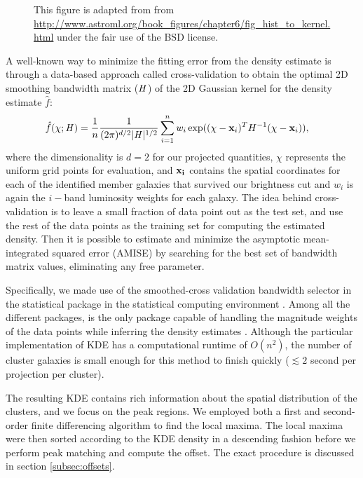 \begin{figure*}
	\caption{This figure is adapted from \citealt{Vanderplas2012} from
\href{http://www.astroml.org/book\_figures/chapter6/fig\_hist\_to\_kernel.html}{http://www.astroml.org/book\_figures/chapter6/fig\_hist\_to\_kernel.html}
under the fair use of the BSD license. \label{fig:bias_variance_tradeoff} }
\end{figure*}
A well-known way to minimize the fitting error from the density estimate is through
a data-based approach called cross-validation to obtain 
the optimal 2D smoothing
bandwidth matrix ($\mathbf{\it H}$) of the 2D Gaussian kernel for the
density estimate $\hat{f}$:
\begin{align}
	\hat{f}(\chi; \mathbf{\it H}) &= \frac{1}{n} \frac{1}{(2\pi)^{d/2}|\mathbf{\it H}|^{1/2}}
	\sum_{i=1}^n w_i \exp((\chi-{\bf x}_i)^T H^{-1} (\chi-{\bf x}_i)),
	\label{eq:cross_validated_bandwidth}
\end{align}
where the dimensionality is $d=2$ for our projected quantities,
$\chi$ represents the uniform grid points for evaluation, and 
$\bf{x}_i$ contains the spatial coordinates for each of the identified member 
galaxies that survived our brightness cut and $w_i$ is again the $i-$band
luminosity weights for each galaxy.
The idea behind cross-validation is to leave a small fraction of data point 
out as the test set, and use the rest of the data points as 
the training set for computing the estimated density.
Then it is possible to estimate and minimize the asymptotic mean-integrated squared error
(AMISE)  by searching
for the best set of bandwidth matrix values, eliminating any free parameter. 

Specifically, we made use of the smoothed-cross validation \citep{Hall1992} 
bandwidth selector in the statistical package {} \citep{Duong2007} 
in the {} statistical computing environment \citep{R_core}. 
Among all the different {} packages, {} is the
only package capable of handling the magnitude weights of the data points 
while inferring the density estimates \citep{Deng2011}. 
Although the particular implementation of KDE has a computational runtime of $O(n^2)$, 
the number of cluster galaxies is
small enough for this method to finish quickly ($\lesssim 2$ second per
projection per cluster). 

The resulting KDE contains rich information about the spatial distribution of
the clusters, and we focus on the peak regions.  
We employed both a first and second-order  
finite differencing algorithm to find the local maxima.  
The local maxima were then sorted according to the KDE density in a descending
fashion before we perform peak matching and compute the offset. The exact
procedure is discussed in section \ref{subsec:offsets}. 

